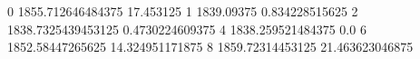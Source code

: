0 1855.712646484375 17.453125
1 1839.09375 0.834228515625
2 1838.7325439453125 0.4730224609375
4 1838.259521484375 0.0
6 1852.58447265625 14.324951171875
8 1859.72314453125 21.463623046875
